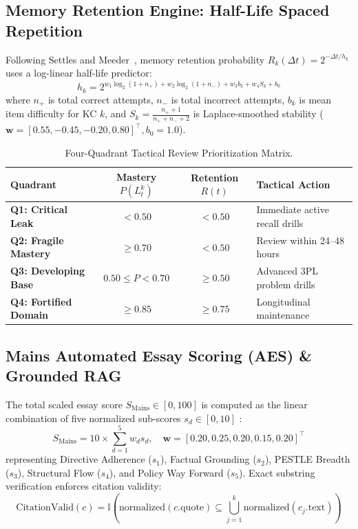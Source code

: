 \documentclass[conference]{IEEEtran}
\begin{document}
\subsection{Memory Retention Engine: Half-Life Spaced Repetition}
Following Settles and Meeder~\cite{SettlesMeeder2016}, memory retention probability $R_k(\Delta t) = 2^{-\Delta t / h_k}$ uses a log-linear half-life predictor:
\begin{equation}
    h_k = 2^{w_1 \log_2(1 + n_+) + w_2 \log_2(1 + n_-) + w_3 b_k + w_4 S_k + b_0}
    \label{eq:hlr_feature_halflife}
\end{equation}
where $n_+$ is total correct attempts, $n_-$ is total incorrect attempts, $b_k$ is mean item difficulty for KC $k$, and $S_k = \frac{n_+ + 1}{n_+ + n_- + 2}$ is Laplace-smoothed stability ($\mathbf{w} = [0.55, -0.45, -0.20, 0.80]^\top, b_0 = 1.0$).

\begin{table}[h]
\centering
\caption{Four-Quadrant Tactical Review Prioritization Matrix.}
\label{tab:priority_matrix}
\small
\begin{tabularx}{\columnwidth}{lccX}
\toprule
\textbf{Quadrant} & \textbf{Mastery $P(L_t^k)$} & \textbf{Retention $R(t)$} & \textbf{Tactical Action} \\
\midrule
\textbf{Q1: Critical Leak} & $< 0.50$ & $< 0.50$ & Immediate active recall drills \\
\textbf{Q2: Fragile Mastery} & $\ge 0.70$ & $< 0.50$ & Review within 24--48 hours \\
\textbf{Q3: Developing Base} & $0.50 \le P < 0.70$ & $\ge 0.50$ & Advanced 3PL problem drills \\
\textbf{Q4: Fortified Domain} & $\ge 0.85$ & $\ge 0.75$ & Longitudinal maintenance \\
\bottomrule
\end{tabularx}
\end{table}

\subsection{Mains Automated Essay Scoring (AES) \& Grounded RAG}
The total scaled essay score $S_{\text{Mains}} \in [0, 100]$ is computed as the linear combination of five normalized sub-scores $s_d \in [0, 10]$ \cite{Lewis2020,Yan2024,Kestin2025}:
\begin{equation}
    S_{\text{Mains}} = 10 \times \sum_{d=1}^5 w_d s_d, \quad \mathbf{w} = [0.20, 0.25, 0.20, 0.15, 0.20]^\top
    \label{eq:mains_score}
\end{equation}
representing Directive Adherence ($s_1$), Factual Grounding ($s_2$), PESTLE Breadth ($s_3$), Structural Flow ($s_4$), and Policy Way Forward ($s_5$). Exact substring verification enforces citation validity:
\begin{equation}
    \text{CitationValid}(c) = \mathbb{I}\left( \text{normalized}(c.\text{quote}) \subseteq \bigcup_{j=1}^k \text{normalized}(c_j.\text{text}) \right)
    \label{eq:citation_valid}
\end{equation}
\end{document}
